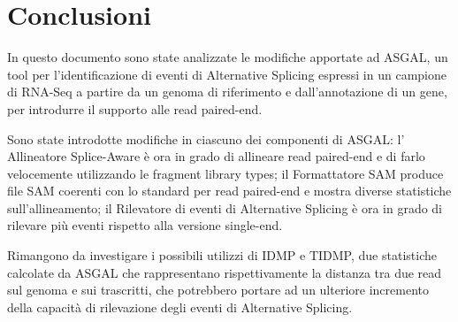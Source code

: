 \section{Conclusioni}
In questo documento sono state analizzate le modifiche apportate ad ASGAL, un tool per l'identificazione di eventi di Alternative Splicing espressi in un campione di RNA-Seq a partire da un genoma di riferimento e dall'annotazione di un gene, per introdurre il supporto alle read paired-end.

Sono state introdotte modifiche in ciascuno dei componenti di ASGAL: l' Allineatore Splice-Aware è ora in grado di allineare read paired-end e di farlo velocemente utilizzando le fragment library types; il Formattatore SAM produce file SAM coerenti con lo standard per read paired-end e mostra diverse statistiche sull'allineamento; il Rilevatore di eventi di Alternative Splicing è ora in grado di rilevare più eventi rispetto alla versione single-end.

Rimangono da investigare i possibili utilizzi di IDMP e TIDMP, due statistiche calcolate da ASGAL che rappresentano rispettivamente la distanza tra due read sul genoma e sui trascritti, che potrebbero portare ad un ulteriore incremento della capacità di rilevazione degli eventi di Alternative Splicing.